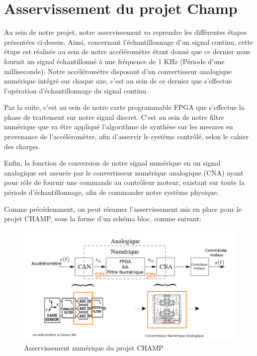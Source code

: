 \documentclass[french,a4paper,12pt]{report}
\begin{document}
	\chapter{Asservissement du projet Champ}
	
		Au sein de notre projet, notre asservissement va reprendre les différentes étapes présentées ci-dessus. Ainsi, concernant l'échantillonnage d'un signal continu, cette étape est réalisée au sein de notre accéléromètre étant donné que ce dernier nous fournit un signal échantillonné à une fréquence de 1 KHz (Période d'une milliseconde). Notre accéléromètre disposant d'un convertisseur analogique numérique intégré sur chaque axe, c'est au sein de ce dernier que s'effectue l'opération d'échantillonnage du signal continu.
		
		Par la suite, c'est au sein de notre carte programmable FPGA que s'effectue la phase de traitement sur notre signal discret. C'est au sein de notre filtre numérique que va être appliqué l'algorithme de synthèse sur les mesures en provenance de l'accéléromètre, afin d'asservir le système contrôlé, selon le cahier des charges.
				
		Enfin, la fonction de conversion de notre signal numérique en un signal analogique est assurée par le convertisseur numérique analogique (CNA) ayant pour rôle de fournir une commande au contrôleur moteur, existant sur toute la période d'échantillonnage, afin de commander notre système physique.
		
		Comme précédemment, on peut résumer l'asservissement mis en place pour le projet CHAMP, sous la forme d'un schéma bloc, comme suivant:
		
	\begin{figure}[!ht]
    \center
  	\includegraphics[width=12cm]{Assert_2.png}
    \caption{Asservissement numérique du projet CHAMP}
	\end{figure}	
		
\end{document}
